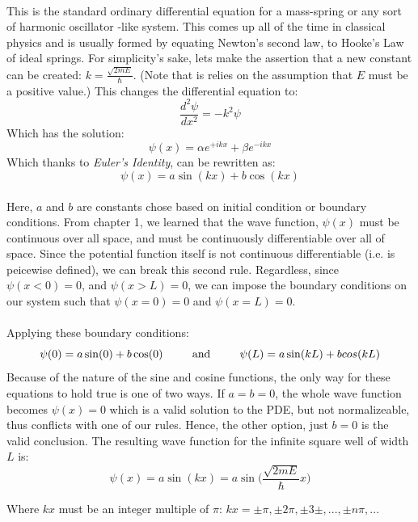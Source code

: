 \documentclass[12pt,letterpaper]{book}
\begin{document}
\paragraph{}This is the standard ordinary differential equation for a mass-spring or any sort of harmonic oscillator -like system. This comes up all of the time in classical physics and is usually formed by equating Newton's second law, to Hooke's Law of ideal springs.  For simplicity's sake, lets make the assertion that a new constant can be created: $k = \frac{\sqrt{2mE}}{\hbar}$. (Note that is relies on the assumption that $E$ must be a positive value.) This changes the differential equation to:
\begin{equation}
\frac{d^2 \psi}{dx^2} = -k^2\psi
\end{equation}
Which has the solution:
\begin{equation}
\psi(x) = \alpha e^{+ikx} + \beta e^{-ikx}
\end{equation}
Which thanks to \textit{Euler's Identity}, can be rewritten as:
\begin{equation}
\psi(x) = a \sin(kx) + b \cos(kx)
\end{equation}
\paragraph*{}Here, $a$ and $b$ are constants chose based on initial condition or boundary conditions. From chapter 1, we learned that the wave function, 
$\psi(x)$ must be continuous over all space, and must be continuously differentiable over all of space. Since the potential function itself is not continuous differentiable (i.e. is peicewise defined), we can break this second rule. Regardless, since $\psi(x<0) = 0 $, and $\psi(x > L) = 0$, we can impose the boundary conditions on our system such that $\psi(x=0) = 0$ and $\psi(x=L) = 0$.
\paragraph*{}Applying these boundary conditions:
\begin{equation}
\psi(0) = a \sin(0) + b \cos(0) 
\text{\hspace*{8mm} and \hspace*{8mm}}
\psi(L) = a \sin(kL) + b \\cos(kL)
\end{equation}
Because of the nature of the sine and cosine functions, the only way for these equations to hold true is one of two ways. If $a = b = 0$, the whole wave function becomes $\psi(x) = 0$ which is a valid solution to the PDE, but not normalizeable, thus conflicts with one of our rules. Hence, the other option, just $b = 0$ is the valid conclusion. The resulting wave function for the infinite square well of width $L$ is:
\begin{equation}
\psi(x) = a \sin(kx) = a \sin\big(\frac{\sqrt{2mE}}{\hbar}x\big)
\end{equation}
\begin{flushright}
Where $kx$ must be an integer multiple of $\pi$: $kx = \pm \pi , \pm 2\pi , \pm 3\pm , ... , \pm n\pi , ...$
\end{flushright}
\end{document}
